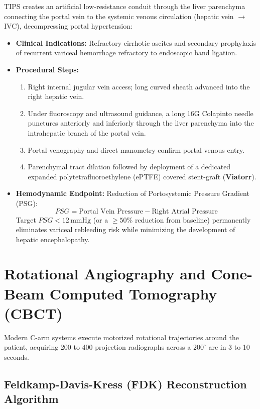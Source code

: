 \documentclass[11pt,a4paper]{article}
\begin{document}
TIPS creates an artificial low-resistance conduit through the liver parenchyma connecting the portal vein to the systemic venous circulation (hepatic vein $\to$ IVC), decompressing portal hypertension:
\begin{itemize}[leftmargin=*]
    \item \textbf{Clinical Indications:} Refractory cirrhotic ascites and secondary prophylaxis of recurrent variceal hemorrhage refractory to endoscopic band ligation.
    \item \textbf{Procedural Steps:}
    \begin{enumerate}
        \item Right internal jugular vein access; long curved sheath advanced into the right hepatic vein.
        \item Under fluoroscopy and ultrasound guidance, a long 16G Colapinto needle punctures anteriorly and inferiorly through the liver parenchyma into the intrahepatic branch of the portal vein.
        \item Portal venography and direct manometry confirm portal venous entry.
        \item Parenchymal tract dilation followed by deployment of a dedicated expanded polytetrafluoroethylene (ePTFE) covered stent-graft (\textbf{Viatorr}).
    \end{enumerate}
    \item \textbf{Hemodynamic Endpoint:} Reduction of Portosystemic Pressure Gradient (PSG):
    \begin{equation}
        PSG = \text{Portal Vein Pressure} - \text{Right Atrial Pressure}
    \end{equation}
    Target $PSG < 12\,\text{mmHg}$ (or a $\ge 50\%$ reduction from baseline) permanently eliminates variceal rebleeding risk while minimizing the development of hepatic encephalopathy.
\end{itemize}

\newpage
\section{Rotational Angiography and Cone-Beam Computed Tomography (CBCT)}

Modern C-arm systems execute motorized rotational trajectories around the patient, acquiring 200 to 400 projection radiographs across a $200^\circ$ arc in 3 to 10 seconds.

\subsection{Feldkamp-Davis-Kress (FDK) Reconstruction Algorithm}
\end{document}

